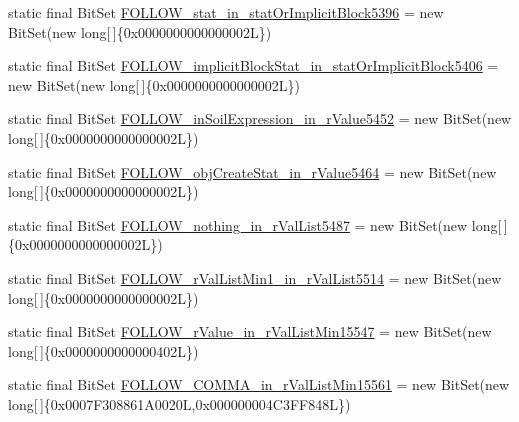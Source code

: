 \begin{DoxyCompactItemize}
\item 
static final Bit\-Set \hyperlink{classorg_1_1tzi_1_1use_1_1parser_1_1shell_1_1_shell_command_parser_a66ece9a2f61e282afdafd9e9dd3d8c80}{F\-O\-L\-L\-O\-W\-\_\-stat\-\_\-in\-\_\-stat\-Or\-Implicit\-Block5396} = new Bit\-Set(new long\mbox{[}$\,$\mbox{]}\{0x0000000000000002\-L\})
\item 
static final Bit\-Set \hyperlink{classorg_1_1tzi_1_1use_1_1parser_1_1shell_1_1_shell_command_parser_a6d6034f4d3aa20ae8afd28856acfce57}{F\-O\-L\-L\-O\-W\-\_\-implicit\-Block\-Stat\-\_\-in\-\_\-stat\-Or\-Implicit\-Block5406} = new Bit\-Set(new long\mbox{[}$\,$\mbox{]}\{0x0000000000000002\-L\})
\item 
static final Bit\-Set \hyperlink{classorg_1_1tzi_1_1use_1_1parser_1_1shell_1_1_shell_command_parser_a991e882472d684814b50d7f70a89eff9}{F\-O\-L\-L\-O\-W\-\_\-in\-Soil\-Expression\-\_\-in\-\_\-r\-Value5452} = new Bit\-Set(new long\mbox{[}$\,$\mbox{]}\{0x0000000000000002\-L\})
\item 
static final Bit\-Set \hyperlink{classorg_1_1tzi_1_1use_1_1parser_1_1shell_1_1_shell_command_parser_a9b72d6421ef1ce53a5ffecfb930fdb98}{F\-O\-L\-L\-O\-W\-\_\-obj\-Create\-Stat\-\_\-in\-\_\-r\-Value5464} = new Bit\-Set(new long\mbox{[}$\,$\mbox{]}\{0x0000000000000002\-L\})
\item 
static final Bit\-Set \hyperlink{classorg_1_1tzi_1_1use_1_1parser_1_1shell_1_1_shell_command_parser_ae30f4935ec9b6b7437712a636ef020c7}{F\-O\-L\-L\-O\-W\-\_\-nothing\-\_\-in\-\_\-r\-Val\-List5487} = new Bit\-Set(new long\mbox{[}$\,$\mbox{]}\{0x0000000000000002\-L\})
\item 
static final Bit\-Set \hyperlink{classorg_1_1tzi_1_1use_1_1parser_1_1shell_1_1_shell_command_parser_ae0f1fe916efd42b7a691079923d25559}{F\-O\-L\-L\-O\-W\-\_\-r\-Val\-List\-Min1\-\_\-in\-\_\-r\-Val\-List5514} = new Bit\-Set(new long\mbox{[}$\,$\mbox{]}\{0x0000000000000002\-L\})
\item 
static final Bit\-Set \hyperlink{classorg_1_1tzi_1_1use_1_1parser_1_1shell_1_1_shell_command_parser_af0dadbcb85d7f9704524f282bbb2d1b8}{F\-O\-L\-L\-O\-W\-\_\-r\-Value\-\_\-in\-\_\-r\-Val\-List\-Min15547} = new Bit\-Set(new long\mbox{[}$\,$\mbox{]}\{0x0000000000000402\-L\})
\item 
static final Bit\-Set \hyperlink{classorg_1_1tzi_1_1use_1_1parser_1_1shell_1_1_shell_command_parser_a0b65b47b3171a5f1810fa3bfcbf341fb}{F\-O\-L\-L\-O\-W\-\_\-\-C\-O\-M\-M\-A\-\_\-in\-\_\-r\-Val\-List\-Min15561} = new Bit\-Set(new long\mbox{[}$\,$\mbox{]}\{0x0007\-F308861\-A0020\-L,0x000000004\-C3\-F\-F848\-L\})

\end{DoxyCompactItemize}
